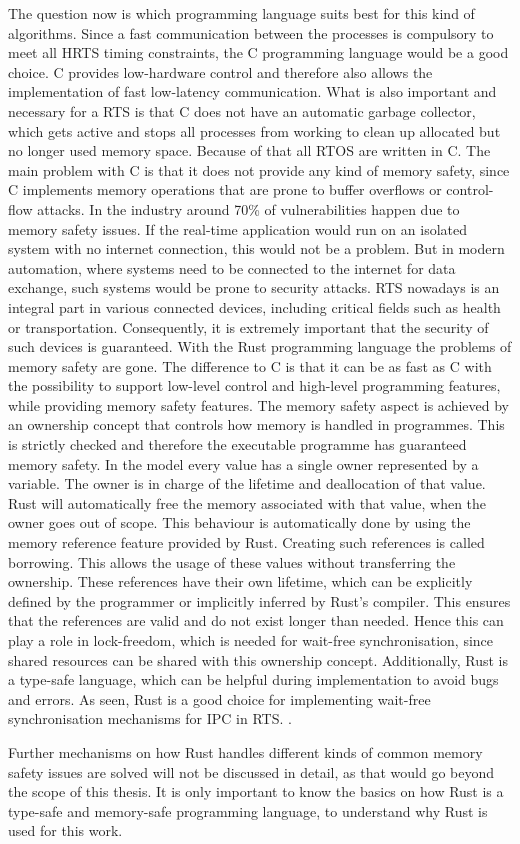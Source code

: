 The question now is which programming language suits best for this kind of algorithms. Since a fast communication between the processes is compulsory to meet all \ac{HRTS} timing constraints, the C programming language would be a good choice. C provides low-hardware control and therefore also allows the implementation of fast low-latency communication. What is also important and necessary for a \ac{RTS} is that C does not have an automatic garbage collector, which gets active and stops all processes from working to clean up allocated but no longer used memory space. Because of that all \ac{RTOS} are written in C. The main problem with C is that it does not provide any kind of memory safety, since C implements memory operations that are prone to buffer overflows or control-flow attacks. In the industry around 70\% of vulnerabilities happen due to memory safety issues. If the real-time application would run on an isolated system with no internet connection, this would not be a problem. But in modern automation, where systems need to be connected to the internet for data exchange, such systems would be prone to security attacks. \ac{RTS} nowadays is an integral part in various connected devices, including critical fields such as health or transportation. Consequently, it is extremely important that the security of such devices is guaranteed. With the Rust programming language the problems of memory safety are gone. The difference to C is that it can be as fast as C with the possibility to support low-level control and high-level programming features, while providing memory safety features. The memory safety aspect is achieved by an ownership concept that controls how memory is handled in programmes. This is strictly checked and therefore the executable programme has guaranteed memory safety. In the model every value has a single owner represented by a variable. The owner is in charge of the lifetime and deallocation of that value. Rust will automatically free the memory associated with that value, when the owner goes out of scope. This behaviour is automatically done by using the memory reference feature provided by Rust. Creating such references is called borrowing. This allows the usage of these values without transferring the ownership. These references have their own lifetime, which can be explicitly defined by the programmer or implicitly inferred by Rust's compiler. This ensures that the references are valid and do not exist longer than needed. Hence this can play a role in lock-freedom, which is needed for wait-free synchronisation, since shared resources can be shared with this ownership concept. Additionally, Rust is a type-safe language, which can be helpful during implementation to avoid bugs and errors. As seen, Rust is a good choice for implementing wait-free synchronisation mechanisms for \ac{IPC} in \ac{RTS}. \cite{xu2023rust, culic2022lowRust}. 

Further mechanisms on how Rust handles different kinds of common memory safety issues are solved will not be discussed in detail, as that would go beyond the scope of this thesis. It is only important to know the basics on how Rust is a type-safe and memory-safe programming language, to understand why Rust is used for this work.
